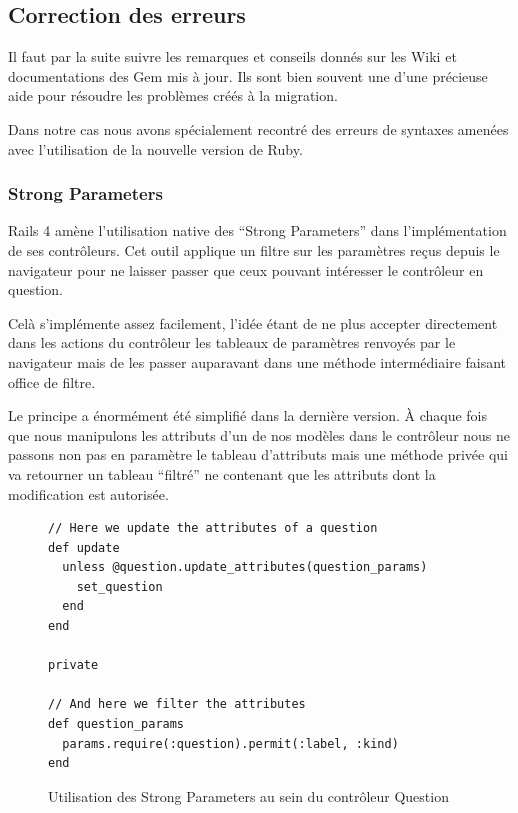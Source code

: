 \documentclass[12pt,a4paper]{book}
\begin{document}
\subsection{Correction des erreurs}

Il faut par la suite suivre les remarques et conseils donnés sur les Wiki et documentations des Gem mis à jour. Ils sont bien souvent une d'une précieuse aide pour résoudre les problèmes créés à la migration. 

Dans notre cas nous avons spécialement recontré des erreurs de syntaxes amenées avec l'utilisation de la nouvelle version de Ruby.

\subsubsection{Strong Parameters}

Rails 4 amène l'utilisation native des ``Strong Parameters'' dans l'implémentation de ses contrôleurs. Cet outil applique un filtre sur les paramètres reçus depuis le navigateur pour ne laisser passer que ceux pouvant intéresser le contrôleur en question.

Celà s'implémente assez facilement, l'idée étant de ne plus accepter directement dans les actions du contrôleur les tableaux de paramètres renvoyés par le navigateur mais de les passer auparavant dans une méthode intermédiaire faisant office de filtre.

Le principe a énormément été simplifié dans la dernière version. À chaque fois que nous manipulons les attributs d'un de nos modèles dans le contrôleur nous ne passons non pas en paramètre le tableau d'attributs mais une méthode privée qui va retourner un tableau ``filtré'' ne contenant que les attributs dont la modification est autorisée.

    \begin{figure}[h]
    \lstset{language=ruby}
    \begin{lstlisting}
// Here we update the attributes of a question
def update
  unless @question.update_attributes(question_params)
    set_question
  end
end

private

// And here we filter the attributes 
def question_params
  params.require(:question).permit(:label, :kind)
end
    \end{lstlisting}
     \caption{Utilisation des Strong Parameters au sein du contrôleur Question}
    \end{figure}
    
\end{document}
